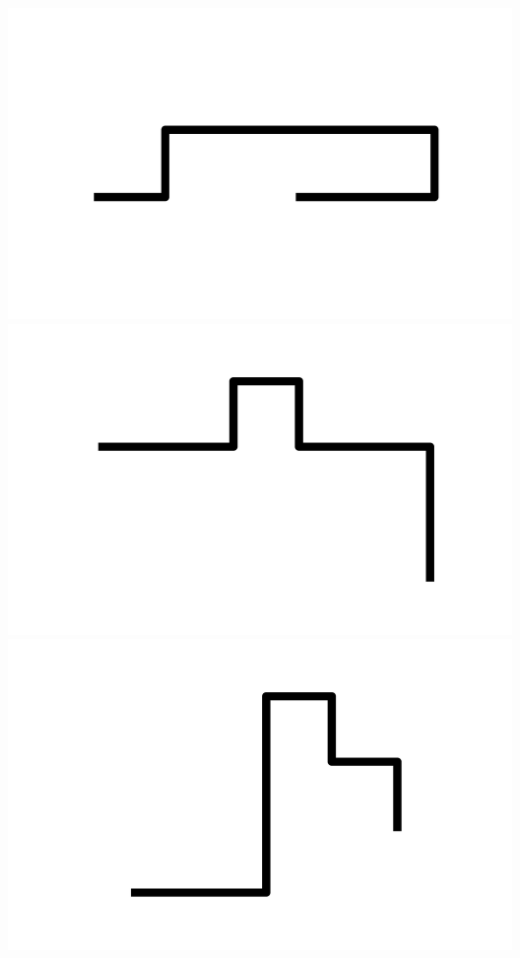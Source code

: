 \documentclass[]{report}
\begin{document}
\includegraphics[scale=.1]{pictures/21/state_cluster_shapes_100.pdf} 
\includegraphics[scale=.1]{pictures/21/state_cluster_shapes_101.pdf} 
\includegraphics[scale=.1]{pictures/21/state_cluster_shapes_102.pdf} 
\end{document}
